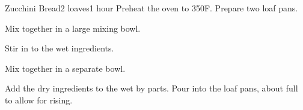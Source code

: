 \documentclass[../Cookbook.tex]{subfiles}
\begin{document}
\begin{recipe}[ZucchiniBread]{Zucchini Bread}{2 loaves}{1 hour}
Preheat the oven to 350\0F. Prepare two loaf pans.

Mix together in a large mixing bowl.

Stir in to the wet ingredients.

Mix together in a separate bowl.

Add the dry ingredients to the wet by parts. Pour into the loaf pans, about  full to allow for rising.

\end{recipe}
\end{document}
